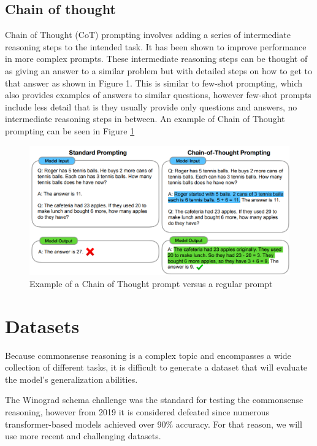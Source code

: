 \documentclass[fleqn,moreauthors,10pt]{ds_report}
\begin{document}
\subsection*{Chain of thought}
Chain of Thought (CoT) \cite{CoT} prompting involves adding a series of intermediate reasoning steps to the intended task. It has been shown to improve performance in more complex prompts.
These intermediate reasoning steps can be thought of as giving an answer to a similar problem but with detailed steps on how to get to that answer as shown in Figure 1. This is similar to few-shot prompting, which also provides examples of answers to similar questions, however few-shot prompts include less detail that is they usually provide only questions and answers, no intermediate reasoning steps in between. \cite{CoT}
An example of Chain of Thought prompting can be seen in Figure \ref{fig:cot}
\begin{figure}[!h]\centering
	\includegraphics[width=\linewidth]{Example_CoT.png}
	\caption{Example of a Chain of Thought prompt versus a regular prompt}
	\label{fig:cot}
\end{figure}





\section*{Datasets}
Because commonsense reasoning is a complex topic and encompasses a wide collection of different tasks, it is difficult to generate a dataset that will evaluate the model's generalization abilities.

The Winograd schema challenge \cite{levesque2012winograd} was the standard for testing the commonsense reasoning, however from 2019 it is considered defeated since numerous transformer-based models achieved over 90\% accuracy. \cite{beaten_winograd}
For that reason, we will use more recent and challenging datasets.
\end{document}
